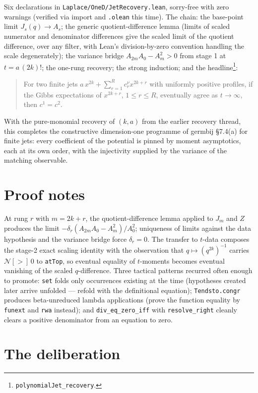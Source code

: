 \documentclass[11pt]{article}
\begin{document}
Six declarations in \texttt{Laplace/OneD/JetRecovery.lean},
sorry-free with zero warnings (verified via import and
\texttt{.olean} this time). The chain: the base-point limit
$J_s(q) \to A_s$; the generic quotient-difference lemma (limits of
scaled numerator and denominator differences give the scaled limit
of the quotient difference, over any filter, with Lean's
division-by-zero convention handling the scale degenerately); the
variance bridge $A_{2m}A_0 - A_m^2 > 0$ from stage 1 at
$t = a\,(2k)!$; the one-rung recovery; the strong induction; and the
headline\footnote{\texttt{polynomialJet\_recovery}.}:
\begin{quote}
For two finite jets $a\,x^{2k} + \sum_{r=1}^R c^\nu_r x^{2k+r}$ with
uniformly positive profiles, if the Gibbs expectations of
$x^{2k+r}$, $1 \le r \le R$, eventually agree as $t \to \infty$,
then $c^1 = c^2$.
\end{quote}
With the pure-monomial recovery of $(k, a)$ from the earlier
recovery thread, this completes the constructive dimension-one
programme of germbij \S7.4(a) for finite jets: every coefficient of
the potential is pinned by moment asymptotics, each at its own order,
with the injectivity supplied by the variance of the matching
observable.

\section{Proof notes}

At rung $r$ with $m = 2k + r$, the quotient-difference lemma applied
to $J_m$ and $Z$ produces the limit
$-\delta_r (A_{2m}A_0 - A_m^2)/A_0^2$; uniqueness of limits against
the data hypothesis and the variance bridge force $\delta_r = 0$. The
transfer to $t$-data composes the stage-2 exact scaling identity with
the observation that $q \mapsto (q^{2k})^{-1}$ carries
$\mathcal{N}[>]\,0$ to \texttt{atTop}, so eventual equality of
$t$-moments becomes eventual vanishing of the scaled $q$-difference.
Three tactical patterns recurred often enough to promote:
\texttt{set} folds only occurrences existing at the time (hypotheses
created later arrive unfolded --- refold with the definitional
equation); \texttt{Tendsto.congr} produces beta-unreduced lambda
applications (prove the function equality by \texttt{funext} and
\texttt{rwa} instead); and \texttt{div\_eq\_zero\_iff} with
\texttt{resolve\_right} cleanly clears a positive denominator from an
equation to zero.

\section{The deliberation}
\end{document}
